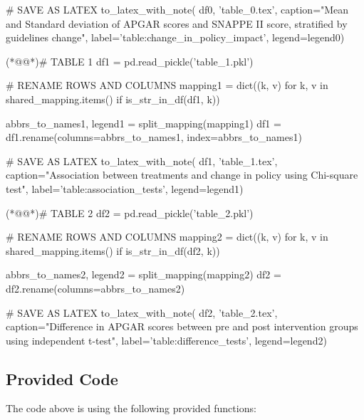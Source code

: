 \documentclass[11pt]{article}
\begin{document}
\begin{python}
# SAVE AS LATEX
to_latex_with_note(
    df0, 'table_0.tex', 
    caption="Mean and Standard deviation of APGAR scores and SNAPPE II score, stratified by guidelines change", 
    label='table:change_in_policy_impact', 
    legend=legend0)

(*@@*)# TABLE 1
df1 = pd.read_pickle('table_1.pkl')

# RENAME ROWS AND COLUMNS
mapping1 = dict((k, v) for k, v in shared_mapping.items() if is_str_in_df(df1, k)) 

abbrs_to_names1, legend1 = split_mapping(mapping1)
df1 = df1.rename(columns=abbrs_to_names1, index=abbrs_to_names1)

# SAVE AS LATEX
to_latex_with_note(
    df1, 'table_1.tex', 
    caption="Association between treatments and change in policy using Chi-square test", 
    label='table:association_tests', 
    legend=legend1)

(*@@*)# TABLE 2
df2 = pd.read_pickle('table_2.pkl')

# RENAME ROWS AND COLUMNS
mapping2 = dict((k, v) for k, v in shared_mapping.items() if is_str_in_df(df2, k))

abbrs_to_names2, legend2 = split_mapping(mapping2)
df2 = df2.rename(columns=abbrs_to_names2)

# SAVE AS LATEX
to_latex_with_note(
    df2, 'table_2.tex', 
    caption="Difference in APGAR scores between pre and post intervention groups using independent t-test", 
    label='table:difference_tests', 
    legend=legend2)


\end{python}

\subsection{Provided Code}
The code above is using the following provided functions:
\end{document}
